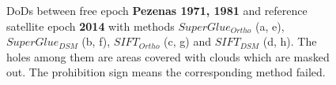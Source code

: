 \begin{figure}[htbp]
\begin{center}
		
		\caption{{\scriptsize \ac{DoD}s between free epoch \textbf{Pezenas 1971, 1981} and reference satellite epoch \textbf{2014} with methods $SuperGlue_{Ortho}$ (a, e), $SuperGlue_{DSM}$ (b, f), $SIFT_{Ortho}$ (c, g) and $SIFT_{DSM}$ (d, h). The holes among them are areas covered with clouds which are masked out. The prohibition sign means the corresponding method failed.}}
		\label{DoDPezenas-Satellite}
	\end{center}
\end{figure} 

